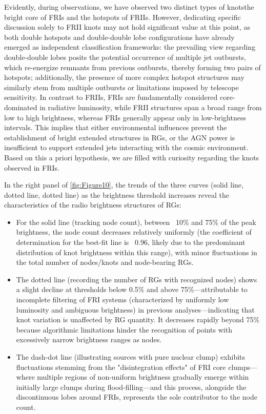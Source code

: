 \documentclass{aa}
\begin{document}
Evidently, during observations, we have observed two distinct types of knots\textemdash the bright core of FRIs and the hotspots of FRIIs. However, dedicating specific discussion solely to FRII knots may not hold significant value at this point, as both double hotspots and double-double lobe configurations have already emerged as independent classification frameworks: the prevailing view regarding double-double lobes posits the potential occurrence of multiple jet outbursts, which re-energize remnants from previous outbursts, thereby forming two pairs of hotspots; additionally, the presence of more complex hotspot structures may similarly stem from multiple outbursts or limitations imposed by telescope sensitivity. In contrast to FRIIs, FRIs are fundamentally considered core-dominated in radiative luminosity, while FRII structures span a broad range from low to high brightness, whereas FRIs generally appear only in low-brightness intervals. This implies that either environmental influences prevent the establishment of bright extended structures in RGs, or the AGN power is insufficient to support extended jets interacting with the cosmic environment. Based on this a priori hypothesis, we are filled with curiosity regarding the knots observed in FRIs.


In the right panel of \autoref{fig:Figure10}, the trends of the three curves (solid line, dotted line, dotted line) as the brightness threshold increases reveal the characteristics of the radio brightness structures of RGs:
\begin{itemize}[label=•]
    
    \item For the solid line (tracking node count), between ~10\% and 75\% of the peak brightness, the node count decreases relatively uniformly (the coefficient of determination for the best-fit line is ~0.96, likely due to the predominant distribution of knot brightness within this range), with minor fluctuations in the total number of nodes/knots and node-bearing RGs.
    
    \item The dotted line (recording the number of RGs with recognized nodes) shows a slight decline at thresholds below 0.5\% and above 75\%—attributable to incomplete filtering of FRI systems (characterized by uniformly low luminosity and ambiguous brightness) in previous analyses—indicating that knot variation is unaffected by RG quantity. It decreases rapidly beyond 75\% because algorithmic limitations hinder the recognition of points with excessively narrow brightness ranges as nodes.
    
    \item The dash-dot line (illustrating sources with pure nuclear clump) exhibits fluctuations stemming from the "disintegration effects" of FRI core clumps—where multiple regions of non-uniform brightness gradually emerge within initially large clumps during flood-filling—and this process, alongside the discontinuous lobes around FRIs, represents the sole contributor to the node count.

\end{itemize}
\end{document}
